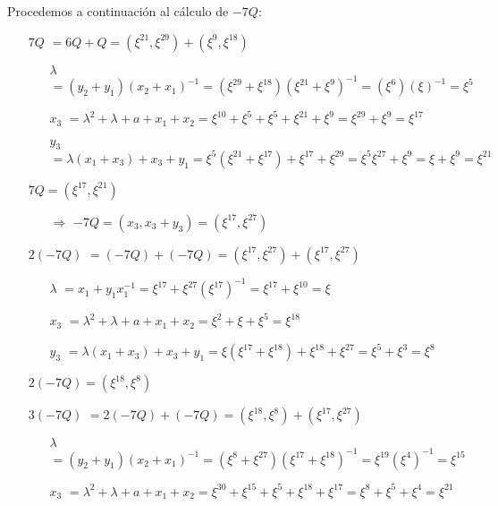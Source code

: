 \documentclass[fleqn]{article}
\begin{document}
    Procedemos a continuación al cálculo de $-7Q$:

    \begin{itemize}
        \item[$7Q$] $ = 6Q + Q = (\xi^{21}, \xi^{29}) + (\xi^9, \xi^{18})$
            \begin{itemize}
                \item[$\lambda$] $ = (y_2 + y_1)(x_2 + x_1)^{-1} = (\xi^{29} + \xi^{18})(\xi^{21} + \xi^{9})^{-1} = (\xi^{6})(\xi)^{-1} = \xi^{5}$
                \item[$x_3$] $ = \lambda^2 + \lambda + a + x_1 + x_2 = \xi^{10} + \xi^{5} + \xi^{5} + \xi^{21} + \xi^{9} = \xi^{29} + \xi^{9} = \xi^{17}$
                \item[$y_3$] $ = \lambda(x_1 + x_3) + x_3 + y_1 = \xi^{5} (\xi^{21} + \xi^{17}) + \xi^{17} + \xi^{29} = \xi^{5} \xi^{27} + \xi^{9} = \xi + \xi^{9} = \xi^{21}$
            \end{itemize}
            $7Q = (\xi^{17}, \xi^{21})$
            \begin{itemize}
                \item[$\Rightarrow$] $-7Q = (x_3, x_3 + y_3) = (\xi^{17}, \xi^{27})$
            \end{itemize}
        \item[$2(-7Q)$] $ = (-7Q) + (-7Q) = (\xi^{17}, \xi^{27}) + (\xi^{17}, \xi^{27})$
            \begin{itemize}
                \item[$\lambda$] $ = x_1 + y_1x_1^{-1} = \xi^{17} + \xi^{27} (\xi^{17})^{-1} = \xi^{17} + \xi^{10} = \xi$
                \item[$x_3$] $ = \lambda^2 + \lambda + a + x_1 + x_2 = \xi^{2} + \xi + \xi^{5} = \xi^{18}$
                \item[$y_3$] $ = \lambda(x_1 + x_3) + x_3 + y_1 = \xi (\xi^{17} + \xi^{18}) + \xi^{18} + \xi^{27} = \xi^{5} + \xi^{3} = \xi^{8}$
            \end{itemize}
            $2(-7Q) = (\xi^{18}, \xi^{8})$
        \item[$3(-7Q)$] $ = 2(-7Q) + (-7Q) = (\xi^{18}, \xi^{8}) + (\xi^{17}, \xi^{27})$
            \begin{itemize}
                \item[$\lambda$] $ = (y_2 + y_1)(x_2 + x_1)^{-1} = (\xi^{8} + \xi^{27}) (\xi^{17} + \xi^{18})^{-1} = \xi^{19} (\xi^{4})^{-1} = \xi^{15}$
                \item[$x_3$] $ = \lambda^2 + \lambda + a + x_1 + x_2 = \xi^{30} + \xi^{15} + \xi^{5} + \xi^{18} + \xi^{17} = \xi^{8} + \xi^{5} + \xi^{4} = \xi^{21}$

\end{itemize}
\end{itemize}
\end{document}
